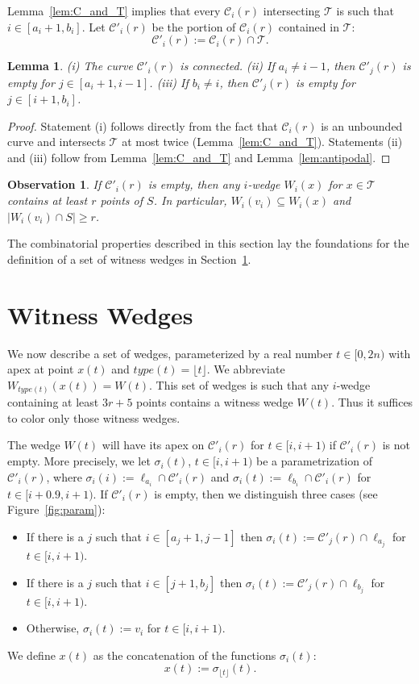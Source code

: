 \documentclass[english,11pt]{article}
\newtheorem{lemma}{Lemma}
\newtheorem{observation}{Observation}
\newcommand{\bigc}{\mathcal C}
\newcommand{\bigt}{\mathcal T}
\begin{document}
\noindent Lemma~\ref{lem:C_and_T} implies that every $\bigc_i(r)$ intersecting $\bigt$ is such that $i \in [a_i{+}1,b_i]$.
Let $\bigc'_i(r)$ be the portion of $\bigc_i(r)$ contained in $\bigt$:
$$
\bigc'_i(r) := \bigc_i(r)\cap\bigt .
$$

\begin{lemma}
(i) The curve $\bigc'_i(r)$ is connected. 
(ii) If $a_i\neq i{-}1$, then $\bigc'_j(r)$ is empty for $j \in [a_i{+}1, i{-}1]$. 
(iii) If $b_i \neq i$, then $\bigc'_j(r)$ is empty for $j \in [i{+}1,b_i]$.
\end{lemma}

\begin{proof}
Statement (i) follows directly from the fact that $\bigc_i(r)$
is an unbounded curve and intersects $\bigt$ at most twice
(Lemma~\ref{lem:C_and_T}). 
Statements (ii) and (iii) follow from Lemma~\ref{lem:C_and_T} and Lemma~\ref{lem:antipodal}.
\end{proof}

\begin{observation}
\label{obs:witnessvi}
If $\bigc'_i(r)$ is empty, then any $i$-wedge $W_i(x)$ for $x\in\bigt$
contains at least $r$ points of $S$. In particular, $W_i(v_i) \subseteq W_i(x)$ and $|W_i(v_i)\cap S|\geq r$.
\end{observation}

The combinatorial properties described in this section lay the foundations for the definition of a set of witness wedges in Section~\ref{sec:wedges}.

\section{Witness Wedges}
\label{sec:wedges}

We now describe a set of wedges, parameterized by a real number
$t\in[0,2n)$ with apex at point $x(t)$ and  
$type(t) = \lfloor t \rfloor$. We abbreviate $W_{type(t)}(x(t)) = W(t)$.
This set of wedges is such that any $i$-wedge containing at
least $3r{+}5$ points contains a witness wedge $W(t)$.
Thus it suffices to color only those witness wedges.

The wedge $W(t)$ will have its apex on $\bigc'_i(r)$ for $t\in
[i,i{+}1)$ if $\bigc'_i(r)$ is not empty.
More precisely, we let $\sigma_i(t)$, $t\in [i,i{+}1)$ be a parametrization of $\bigc'_i(r)$, 
where $\sigma_i(i) := \ell_{a_i}\cap\bigc'_i(r)$ and 
$\sigma_i(t) := \ell_{b_i}\cap\bigc'_i(r)$ for $t\in[i{+}0.9 ,i{+}1)$.
If $\bigc'_i(r)$ is empty, then we distinguish three cases (see Figure~\ref{fig:param}):
\begin{itemize}
\item [A.] If there is a $j$ such that $i\in [a_j{+}1,j{-}1]$ then 
  $\sigma_i(t) := \bigc'_j(r)\cap\ell_{a_j}$ for $t\in[i,i{+}1)$.
\item [B.] If there is a $j$ such that $i\in [j{+}1,b_j]$ then 
  $\sigma_i(t) := \bigc'_j(r)\cap\ell_{b_j}$ for $t\in[i,i{+}1)$.
\item [C.] Otherwise, $\sigma_i(t) := v_i$ for $t\in[i,i{+}1)$.
\end{itemize}
We define $x(t)$ as the concatenation of the functions $\sigma_i(t)$:
$$
x(t) := \sigma_{\lfloor{t}\rfloor}(t).
$$
\end{document}
